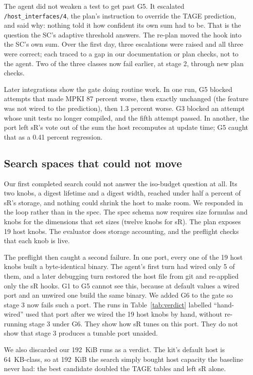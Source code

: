 \documentclass[conference]{IEEEtran}
\begin{document}
The agent did not weaken a test to get past G5. It escalated
\texttt{/host\_interfaces/4}, the plan's instruction to override the TAGE
prediction, and said why: nothing told it how confident its own sum had to be.
That is the question the SC's adaptive threshold answers. The re-plan moved the
hook into the SC's own sum. Over the first day, three escalations were raised
and all three were correct; each traced to a gap in our documentation or plan
checks, not to the agent. Two of the three classes now fail earlier, at stage 2,
through new plan checks.

Later integrations show the gate doing routine work. In one run, G5 blocked
attempts that made MPKI 87 percent worse, then exactly unchanged (the feature
was not wired to the prediction), then 1.3 percent worse. G3 blocked an attempt
whose unit tests no longer compiled, and the fifth attempt passed. In another,
the port left sR's vote out of the sum the host recomputes at update time; G5
caught that as a 0.41 percent regression.

\subsection{Search spaces that could not move}

Our first completed search could not answer the iso-budget question at all. Its
two knobs, a digest lifetime and a digest width, reached under half a percent
of sR's storage, and nothing could shrink the host to make room. We responded
in the loop rather than in the spec. The spec schema now requires size formulas
and knobs for the dimensions that set sizes (twelve knobs for sR). The plan
exposes 19 host knobs. The evaluator does storage accounting, and the preflight
checks that each knob is live.

The preflight then caught a second failure. In one port, every one of the 19
host knobs built a byte-identical binary. The agent's first turn had wired only
5 of them, and a later debugging turn restored the host file from git and
re-applied only the sR hooks. G1 to G5 cannot see this, because at default
values a wired port and an unwired one build the same binary. We added G6 to
the gate so stage 3 now fails such a port. The runs in
Table~\ref{tab:verdict} labelled ``hand-wired'' used that port after we wired
the 19 host knobs by hand, without re-running stage 3 under G6. They show how
sR tunes on this port. They do not show that stage 3 produces a tunable port
unaided.

We also discarded our 192~KiB runs as a verdict. The kit's default host is
64~KB-class, so at 192~KiB the search simply bought host capacity the baseline
never had: the best candidate doubled the TAGE tables and left sR alone.
\end{document}
